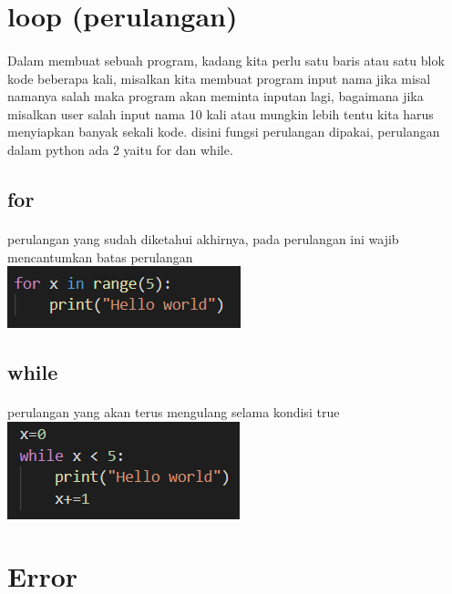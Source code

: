 \documentclass[a4paper,12pt]{report}
\begin{document}
\section{loop (perulangan)}
\paragraph{}
Dalam membuat sebuah program, kadang kita perlu satu baris atau satu blok kode beberapa kali, misalkan kita membuat program input nama jika misal namanya salah maka program akan meminta inputan lagi, bagaimana jika misalkan user salah input nama  10 kali atau mungkin lebih tentu kita harus menyiapkan banyak sekali kode. disini fungsi perulangan dipakai, perulangan dalam python ada 2 yaitu for dan while.
\subsection{for}
\paragraph{}
perulangan yang sudah diketahui akhirnya, pada perulangan ini wajib mencantumkan batas perulangan\\
\includegraphics[scale=1]{images/for.png} 
\subsection{while}
\paragraph{}
perulangan yang akan terus mengulang selama kondisi true\\
\includegraphics[scale=1]{images/while.png} 
\section{Error}
\end{document}
